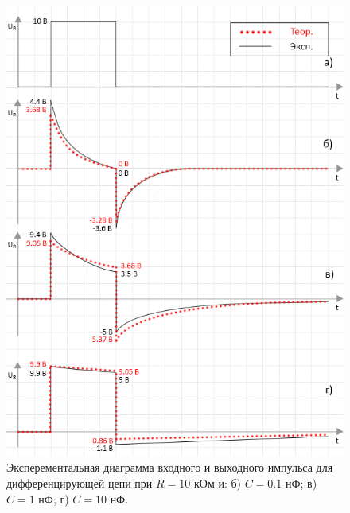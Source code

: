 \begin{figure}[H]
	\begin{center}
		\includegraphics[width=14cm]{img/diff_with_theory}
		\caption{Эксперементальная диаграмма входного и выходного импульса для дифференцирующей цепи при $R = 10$ кОм и: б) $C = 0.1$ нФ; в) $C = 1$ нФ; г) $C = 10$ нФ.} 
		\label{t:1} %
	\end{center}
\end{figure}

